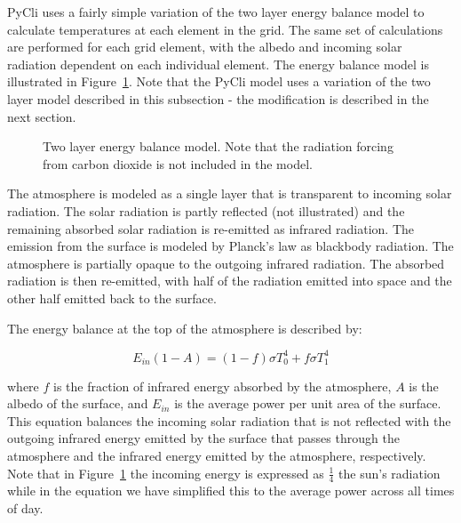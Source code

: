 \documentclass[12pt]{article} %
\begin{document}
PyCli uses a fairly simple variation of the two layer energy balance model to calculate temperatures at each element in the grid. The same set of calculations are performed for each grid element, with the albedo and incoming solar radiation dependent on each individual element. The energy balance model is illustrated in Figure~\ref{fig:2layer}. Note that the PyCli model uses a variation of the two layer model described in this subsection - the modification is described in the next section.

\begin{figure}[H]
	\caption{Two layer energy balance model. Note that the radiation forcing from carbon dioxide is not included in the model.}
	\label{fig:2layer}
\end{figure}

The atmosphere is modeled as a single layer that is transparent to incoming solar radiation. The solar radiation is partly reflected (not illustrated) and the remaining absorbed solar radiation is re-emitted as infrared radiation. The emission from the surface is modeled by Planck's law as blackbody radiation. The atmosphere is partially opaque to the outgoing infrared radiation. The absorbed radiation is then re-emitted, with half of the radiation emitted into space and the other half emitted back to the surface.

The energy balance at the top of the atmosphere is described by:

$$E_{in}(1-A)  = (1-f) \sigma T_0^4 + f \sigma T_1^4$$

where $f$ is the fraction of infrared energy absorbed by the atmosphere, $A$ is the albedo of the surface, and $E_{in}$ is the average power per unit area of the surface. This equation balances the incoming solar radiation that is not reflected with the outgoing infrared energy emitted by the surface that passes through the atmosphere and the infrared energy emitted by the atmosphere, respectively. Note that in Figure~\ref{fig:2layer} the incoming energy is expressed as $\frac{1}{4}$ the sun's radiation while in the equation we have simplified this to the average power across all times of day.
\end{document}
